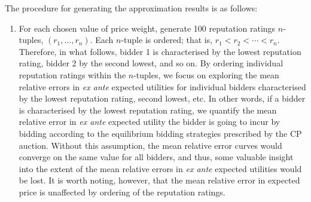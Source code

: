 The procedure for generating the approximation results is as follows:
\begin{enumerate}
\item For each chosen value of price weight, generate 100 reputation ratings $n$-tuples, $(r_1,\ldots, r_n)$. Each $n$-tuple is ordered; that is, $r_1 < r_2 < \cdots < r_n$. Therefore, in what follows, bidder 1 is characterised by the lowest reputation rating, bidder 2 by the second lowest, and so on. By ordering individual reputation ratings within the $n$-tuples, we focus on exploring the mean relative errors in \emph{ex ante} expected utilities for individual bidders characterised by the lowest reputation rating, second lowest, etc. In other words, if a bidder is characterised by the lowest reputation rating, we quantify the mean relative error in \emph{ex ante} expected utility the bidder is going to incur by bidding according to the equilibrium bidding strategies prescribed by the CP auction. Without this assumption, the mean relative error curves would converge on the same value for all bidders, and thus, some valuable insight into the extent of the mean relative errors in \emph{ex ante} expected utilities would be lost. It is worth noting, however, that the mean relative error in expected price is unaffected by ordering of the reputation ratings.


\end{enumerate}
